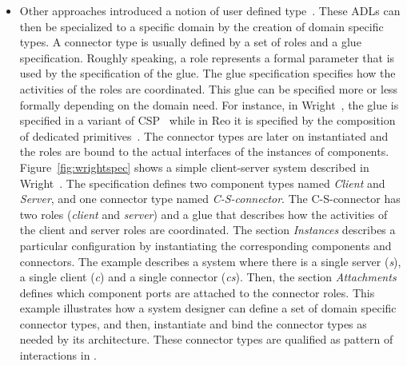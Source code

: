 \begin{itemize}
			\item Other approaches introduced a notion of user defined type~\cite{uniconbib,wrightbib,reobib}. These ADLs can then be specialized to a specific domain by the creation of domain specific types. A connector type is usually defined by a set of roles and a glue specification. Roughly speaking, a role represents a formal parameter that is used by the specification of the glue. The glue specification specifies how the activities of the roles are coordinated. This glue can be specified more or less formally depending on the domain need. For instance, in Wright~\cite{wrightbib}, the glue is specified in a variant of CSP~\cite{csphoarebib} while in Reo it is specified by the composition of dedicated primitives~\cite{reobib}. The connector types are later on instantiated and the roles are bound to the actual interfaces of the instances of components. Figure~\ref{fig:wrightspec} shows a simple client-server system described in Wright~\cite{wrightbib}. The specification defines two component types named \emph{Client} and \emph{Server}, and one connector type named \emph{C-S-connector}. The C-S-connector has two roles (\emph{client} and \emph{server}) and a glue that describes how the activities of the client and server roles are coordinated. The section \emph{Instances} describes a particular configuration by instantiating the corresponding components and connectors. The example describes a system where there is a single server (\emph{s}), a single client (\emph{c}) and a single connector (\emph{cs}). Then, the section \emph{Attachments} defines which component ports are attached to the connector roles. This example illustrates how a system designer can define a set of domain specific connector types, and then, instantiate and bind the connector types as needed by its architecture. These connector types are qualified as pattern of interactions in \cite{wrightbib}. 
			

\end{itemize}
